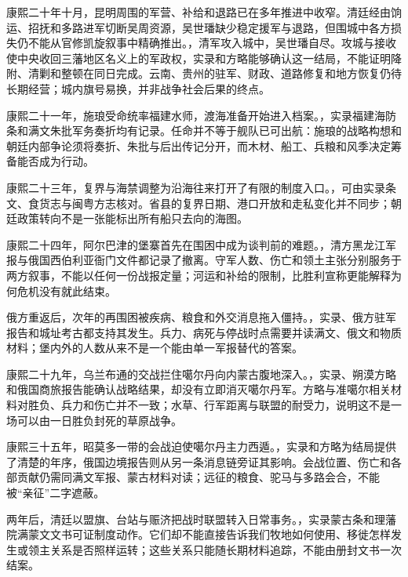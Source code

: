 康熙二十年十月，昆明周围的军营、补给和退路已在多年推进中收窄。清廷经由饷运、招抚和多路进军切断吴周资源，吴世璠缺少稳定援军与退路，但围城中各方损失仍不能从官修凯旋叙事中精确推出。，清军攻入城中，吴世璠自尽。攻城与接收使中央收回三藩地区名义上的军政权，实录和方略能够确认这一结局，不能证明降附、清剿和整顿在同日完成。云南、贵州的驻军、财政、道路修复和地方恢复仍待长期经营；城内旗号易换，并非战争社会后果的终点。

康熙二十一年，施琅受命统率福建水师，渡海准备开始进入档案。，实录福建海防条和满文朱批军务奏折均有记录。任命并不等于舰队已可出航：施琅的战略构想和朝廷内部争论须将奏折、朱批与后出传记分开，而木材、船工、兵粮和风季决定筹备能否成为行动。

康熙二十三年，复界与海禁调整为沿海往来打开了有限的制度入口。，可由实录条文、食货志与闽粤方志核对。省县的复界日期、港口开放和走私变化并不同步；朝廷政策转向不是一张能标出所有船只去向的海图。

康熙二十四年，阿尔巴津的堡寨首先在围困中成为谈判前的难题。，清方黑龙江军报与俄国西伯利亚衙门文件都记录了撤离。守军人数、伤亡和领土主张分别服务于两方叙事，不能以任何一份战报定量；河运和补给的限制，比胜利宣称更能解释为何危机没有就此结束。

俄方重返后，次年的再围困被疾病、粮食和外交消息拖入僵持。，实录、俄方驻军报告和城址考古都支持其发生。兵力、病死与停战时点需要并读满文、俄文和物质材料；堡内外的人数从来不是一个能由单一军报替代的答案。

康熙二十九年，乌兰布通的交战拦住噶尔丹向内蒙古腹地深入。，实录、朔漠方略和俄国商旅报告能确认战略结果，却没有立即消灭噶尔丹军。方略与准噶尔相关材料对胜负、兵力和伤亡并不一致；水草、行军距离与联盟的耐受力，说明这不是一场可以由一日胜负封死的草原战争。

康熙三十五年，昭莫多一带的会战迫使噶尔丹主力西遁。，实录和方略为结局提供了清楚的年序，俄国边境报告则从另一条消息链旁证其影响。会战位置、伤亡和各部贡献仍需同满文军报、蒙古材料对读；远征的粮食、驼马与多路会合，不能被“亲征”二字遮蔽。

两年后，清廷以盟旗、台站与赈济把战时联盟转入日常事务。，实录蒙古条和理藩院满蒙文文书可证制度动作。它们却不能直接告诉我们牧地如何使用、移徙怎样发生或领主关系是否照样运转；这些关系只能随长期材料追踪，不能由册封文书一次结案。

